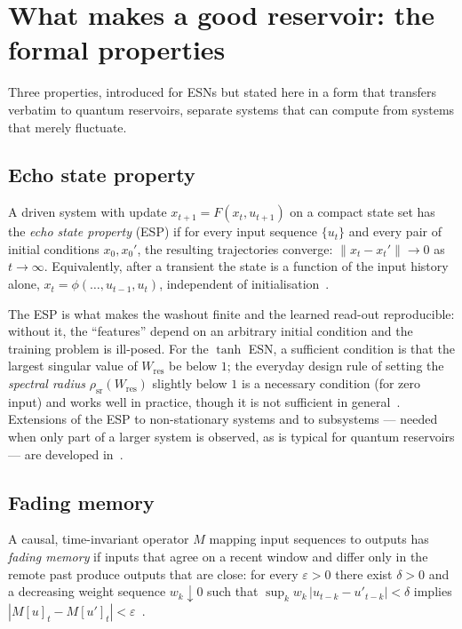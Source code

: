 \section{What makes a good reservoir: the formal properties}
\label{sec:properties}

Three properties, introduced for ESNs but stated here in a form that transfers
verbatim to quantum reservoirs, separate systems that can compute from systems
that merely fluctuate.

\subsection{Echo state property}

\begin{definition}
\label{def:esp}
A driven system with update $x_{t+1} = F(x_t, u_{t+1})$ on a compact state set
has the \emph{echo state property} (ESP) if for every input sequence
$\{u_t\}$ and every pair of initial conditions $x_0, x_0'$, the resulting
trajectories converge: $\lVert x_t - x_t'\rVert \to 0$ as $t \to \infty$.
Equivalently, after a transient the state is a function of the input history
alone, $x_t = \phi(\dots, u_{t-1}, u_t)$, independent of initialisation~\citep{jaeger2001echo}.
\end{definition}

The ESP is what makes the washout finite and the learned read-out
reproducible: without it, the ``features'' depend on an arbitrary initial
condition and the training problem is ill-posed. For the $\tanh$ ESN, a
sufficient condition is that the largest singular value of
$W_{\mathrm{res}}$ be below $1$; the everyday design rule of setting the
\emph{spectral radius} $\rho_{\mathrm{sr}}(W_{\mathrm{res}})$ slightly below
$1$ is a necessary condition (for zero input) and works well in practice,
though it is not sufficient in general~\citep{jaeger2001echo,lukosevicius2009reservoir}.
Extensions of the ESP to non-stationary systems and to subsystems --- needed when
only part of a larger system is observed, as is typical for quantum
reservoirs --- are developed in~\citet{kobayashi2024extending}.

\subsection{Fading memory}

\begin{definition}
\label{def:fading}
A causal, time-invariant operator $M$ mapping input sequences to outputs has
\emph{fading memory} if inputs that agree on a recent window and differ only in
the remote past produce outputs that are close: for every $\varepsilon>0$
there exist $\delta>0$ and a decreasing weight sequence $w_k \downarrow 0$ such
that $\sup_k w_k\,|u_{t-k}-u'_{t-k}| < \delta$ implies
$|M[u]_t - M[u']_t| < \varepsilon$~\citep{boyd1985fading}.
\end{definition}

